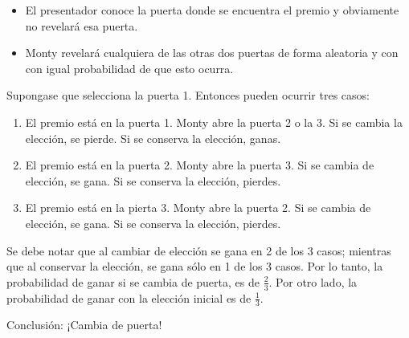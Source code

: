 \begin{itemize}
\item El presentador conoce la puerta donde se encuentra el premio y obviamente
no revelará esa puerta. 
\item Monty revelar\'a cualquiera de las otras dos puertas de forma aleatoria y
con con igual probabilidad de que esto ocurra.
\end{itemize}
Supongase que selecciona la puerta 1. Entonces pueden ocurrir tres casos:
\begin{enumerate}
\item El premio está en la puerta 1. Monty abre la puerta 2 o la 3. Si se cambia
la elecci\'on, se pierde. Si se conserva la elecci\'on, ganas.
\item El premio está en la puerta 2. Monty abre la puerta 3. Si se cambia de
elecci\'on, se gana. Si se conserva la elecci\'on, pierdes.
\item El premio está en la pierta 3. Monty abre la puerta 2. Si se cambia de
elecci\'on, se gana. Si se conserva la elecci\'on, pierdes.
\end{enumerate}
Se debe notar que al cambiar de elecci\'on se gana en 2 de los 3 casos; mientras
que al conservar la elecci\'on, se gana s\'olo en 1 de los 3 casos. Por lo
tanto, la probabilidad de ganar si se cambia de puerta, es de $\frac{2}{3}$. Por
otro lado, la probabilidad de ganar con la elecci\'on inicial es de
$\frac{1}{3}$.

Conclusi\'on: ¡Cambia de puerta!
